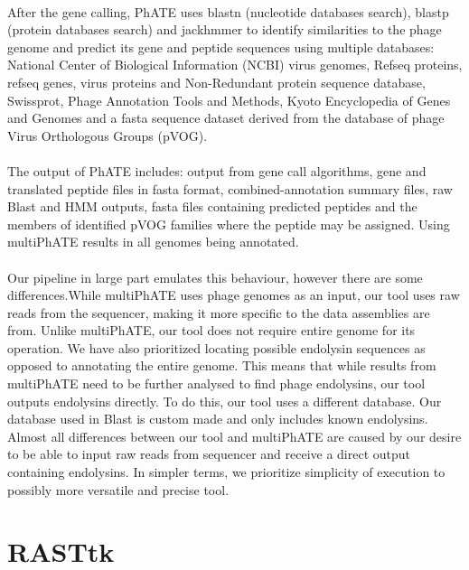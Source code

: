 \paragraph*{}
After the gene calling, PhATE uses blastn (nucleotide databases search), blastp (protein databases search) and jackhmmer to identify similarities to the phage genome and predict its gene and peptide sequences using multiple databases: National Center of Biological Information (NCBI) virus genomes, Refseq proteins, refseq genes, virus proteins and Non-Redundant protein sequence database, Swissprot, Phage Annotation Tools and Methods, Kyoto Encyclopedia of Genes and Genomes and a fasta sequence dataset derived from the database of phage Virus Orthologous Groups (pVOG).
\paragraph*{}
The output of PhATE includes: output from gene call algorithms, gene and translated peptide files in fasta format, combined-annotation summary files, raw Blast and HMM outputs, fasta files containing predicted peptides and the members of identified pVOG families where the peptide may be assigned. Using multiPhATE results in all genomes being annotated.
\paragraph*{}
Our pipeline in large part emulates this behaviour, however there are some differences.While multiPhATE uses phage genomes as an input, our tool uses raw reads from the sequencer, making it more specific to the data assemblies are from. Unlike multiPhATE, our tool does not require entire genome for its operation. We have also prioritized locating possible endolysin sequences as opposed to annotating the entire genome. This means that while results from multiPhATE need to be further analysed to find phage endolysins, our tool outputs endolysins directly. To do this, our tool uses a different database. Our database used in Blast is custom made and only includes known endolysins. Almost all differences between our tool and multiPhATE are caused by our desire to be able to input raw reads from sequencer and receive a direct output containing endolysins. In simpler terms, we prioritize simplicity of execution to possibly more versatile and precise tool.

\section{RASTtk}
